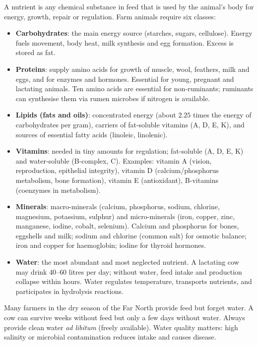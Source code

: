 \documentclass[11pt]{article}
\newcommand{\cle}[1]{{\popxbold\color{popdark}#1}}
\begin{document}
\begin{definition}
A \cle{nutrient} is any chemical substance in feed that is used by the animal's body for energy, growth, repair or regulation. Farm animals require six classes:
\begin{itemize}
\item \textbf{Carbohydrates}: the main \cle{energy} source (starches, sugars, cellulose). Energy fuels movement, body heat, milk synthesis and egg formation. Excess is stored as fat.
\item \textbf{Proteins}: supply \cle{amino acids} for growth of muscle, wool, feathers, milk and eggs, and for enzymes and hormones. Essential for young, pregnant and lactating animals. Ten amino acids are essential for non-ruminants; ruminants can synthesise them via rumen microbes if nitrogen is available.
\item \textbf{Lipids (fats and oils)}: concentrated energy (about $2.25$ times the energy of carbohydrates per gram), carriers of fat-soluble vitamins (A, D, E, K), and sources of essential fatty acids (linoleic, linolenic).
\item \textbf{Vitamins}: needed in tiny amounts for regulation; fat-soluble (A, D, E, K) and water-soluble (B-complex, C). Examples: vitamin A (vision, reproduction, epithelial integrity), vitamin D (calcium/phosphorus metabolism, bone formation), vitamin E (antioxidant), B-vitamins (coenzymes in metabolism).
\item \textbf{Minerals}: macro-minerals (calcium, phosphorus, sodium, chlorine, magnesium, potassium, sulphur) and micro-minerals (iron, copper, zinc, manganese, iodine, cobalt, selenium). Calcium and phosphorus for bones, eggshells and milk; sodium and chlorine (common salt) for osmotic balance; iron and copper for haemoglobin; iodine for thyroid hormones.
\item \textbf{Water}: the most abundant and most neglected nutrient. A lactating cow may drink $40$--$60$ litres per day; without water, feed intake and production collapse within hours. Water regulates temperature, transports nutrients, and participates in hydrolysis reactions.
\end{itemize}
\end{definition}

\begin{attention}
Many farmers in the dry season of the Far North provide feed but forget water. A cow can survive weeks without feed but only a few days without water. Always provide clean water \emph{ad libitum} (freely available). Water quality matters: high salinity or microbial contamination reduces intake and causes disease.
\end{attention}
\end{document}
